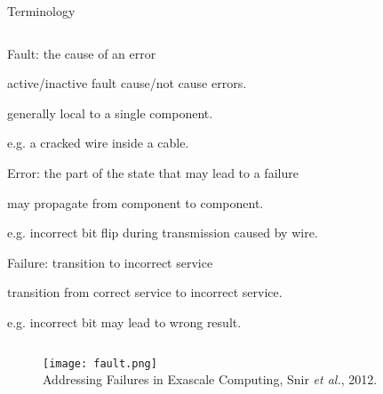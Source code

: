 \begin{frame}{Terminology}

\begin{columns}
\begin{column}{1.1\textwidth}
\bi
\item Fault: the cause of an error 
\bi
\item active/inactive fault cause/not cause errors.
\item generally local to a single component.
\item e.g. a cracked wire inside a cable.
\ei
%
\ssk
\item Error: the part of the state that may 
lead to a failure %
\bi
\item may propagate from component to component.
\item e.g. incorrect bit flip during transmission caused by wire.
\ei
%
\ssk
\item Failure: transition to incorrect service 
\bi
\item transition from correct service to incorrect service.
\item e.g. incorrect bit may lead to wrong result. 
\ei
%
\mmk
\ei
\end{column}
\end{columns}
%
\begin{columns}
\begin{column}{1.0\textwidth}
\begin{figure}
\vspace{-0.25cm}
\texttt{[image: fault.png]}\\
{\footnotesize Addressing Failures in Exascale Computing, 
Snir {\it et al.}, 2012.}
\end{figure}
\end{column}
\end{columns}


\end{frame}





